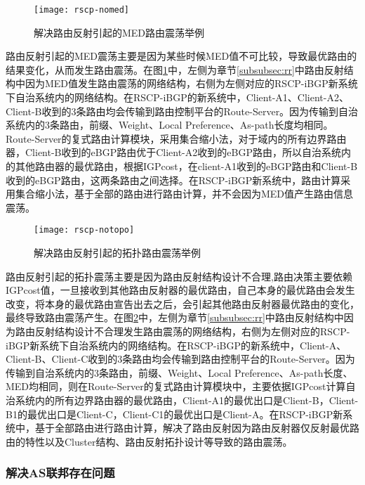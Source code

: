\begin{figure}
  \centering
  \texttt{[image: rscp-nomed]}
  \caption{解决路由反射引起的MED路由震荡举例}
  \label{fig:rscp-nomed}
\end{figure}



路由反射引起的MED震荡主要是因为某些时候MED值不可比较，导致最优路由的结果变化，从而发生路由震荡。在图\ref{fig:rscp-nomed}中，左侧为章节\ref{subsubsec:rr}中路由反射结构中因为MED值发生路由震荡的网络结构，右侧为左侧对应的RSCP-iBGP新系统下自治系统内的网络结构。在RSCP-iBGP的新系统中，Client-A1、Client-A2、Client-B收到的3条路由均会传输到路由控制平台的Route-Server。因为传输到自治系统内的3条路由，前缀、Weight、Local Preference、As-path长度均相同。Route-Server的复式路由计算模块，采用集合缩小法，对于域内的所有边界路由器，Client-B收到的eBGP路由优于Client-A2收到的eBGP路由，所以自治系统内的其他路由器的最优路由，根据IGPcost，在client-A1收到的eBGP路由和Client-B收到的eBGP路由，这两条路由之间选择。在RSCP-iBGP新系统中，路由计算采用集合缩小法，基于全部的路由进行路由计算，并不会因为MED值产生路由信息震荡。\\


\begin{figure}
  \centering
  \texttt{[image: rscp-notopo]}
  \caption{解决路由反射引起的拓扑路由震荡举例}
  \label{fig:rscp-notopo}
\end{figure}


路由反射引起的拓扑震荡主要是因为路由反射结构设计不合理,路由决策主要依赖IGPcost值，一旦接收到其他路由反射器的最优路由，自己本身的最优路由会发生改变，将本身的最优路由宣告出去之后，会引起其他路由反射器最优路由的变化，最终导致路由震荡产生。在图\ref{fig:rscp-notopo}中，左侧为章节\ref{subsubsec:rr}中路由反射结构中因为路由反射结构设计不合理发生路由震荡的网络结构，右侧为左侧对应的RSCP-iBGP新系统下自治系统内的网络结构。在RSCP-iBGP的新系统中，Client-A、Client-B、Client-C收到的3条路由均会传输到路由控制平台的Route-Server。因为传输到自治系统内的3条路由，前缀、Weight、Local Preference、As-path长度、MED均相同，则在Route-Server的复式路由计算模块中，主要依据IGPcost计算自治系统内的所有边界路由器的最优路由，Client-A1的最优出口是Client-B，Client-B1的最优出口是Client-C，Client-C1的最优出口是Client-A。在RSCP-iBGP新系统中，基于全部路由进行路由计算，解决了路由反射因为路由反射器仅反射最优路由的特性以及Cluster结构、路由反射拓扑设计等导致的路由震荡。

\subsubsection{解决AS联邦存在问题}


